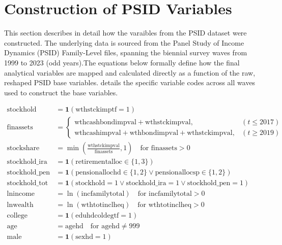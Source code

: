 
\section{Construction of PSID Variables}
\label{sec:appendix_psid}

This section describes in detail how the varaibles from the PSID dataset were constructed. The underlying data is sourced from the Panel Study of Income Dynamics (PSID) Family-Level files, spanning the biennial survey waves from 1999 to 2023 (odd years).The equations below formally define how the final analytical variables are mapped and calculated directly as a function of the raw, reshaped PSID base variables.  details the specific variable codes across all waves used to construct the base variables.

$$
\begin{aligned}
\text{stockhold} &= \mathbf{1}(\text{wthstckimptf} = 1) \\[8pt]
\text{finassets} &= 
\begin{cases} 
\text{wthcashbondimpval} + \text{wthstckimpval}, & ( t \le 2017 ) \\
\text{wthcashimpval} + \text{wthbondimpval} + \text{wthstckimpval}, & ( t \ge 2019 ) 
\end{cases} \\[8pt]
\text{stockshare} &= \min \left( \frac{\text{wthstckimpval}}{\text{finassets}}, 1 \right) \quad \text{for finassets} > 0 \\[8pt]
\text{stockhold\_ira} &= \mathbf{1}(\text{retirementalloc} \in \{1, 3\}) \\[8pt]
\text{stockhold\_pen} &= \mathbf{1}(\text{pensionallochd} \in \{1, 2\} \lor \text{pensionallocsp} \in \{1, 2\}) \\[8pt]
\text{stockhold\_tot} &= \mathbf{1}(\text{stockhold} = 1 \lor \text{stockhold\_ira} = 1 \lor \text{stockhold\_pen} = 1) \\[8pt]
\text{lnincome} &= \ln(\text{incfamilytotal}) \quad \text{for incfamilytotal} > 0 \\[8pt]
\text{lnwealth} &= \ln(\text{wthtotinclheq}) \quad \text{for wthtotinclheq} > 0 \\[8pt]
\text{college} &= \mathbf{1}(\text{eduhdcoldegtf} = 1) \\[8pt]
\text{age} &= \text{agehd} \quad \text{for agehd} \neq 999 \\[8pt]
\text{male} &= \mathbf{1}(\text{sexhd} = 1)
\end{aligned}
$$

